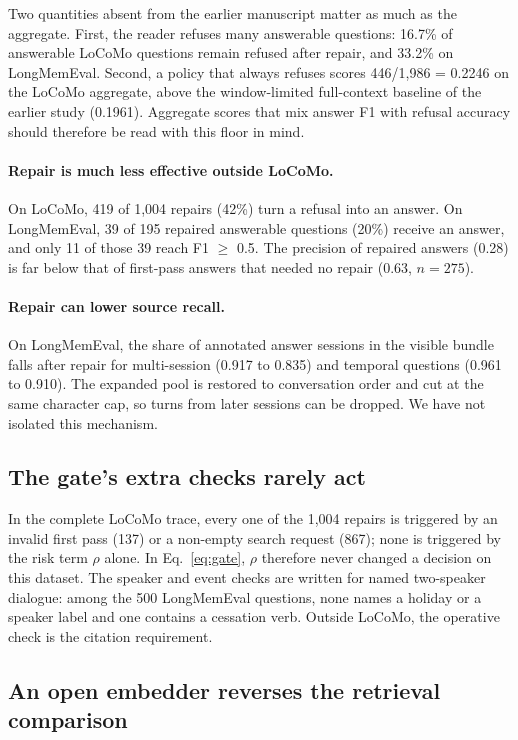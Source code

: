 \documentclass[11pt]{article}
\begin{document}
Two quantities absent from the earlier manuscript matter as much as the
aggregate. First, the reader refuses many answerable questions: 16.7\% of
answerable LoCoMo questions remain refused after repair, and 33.2\% on
LongMemEval. Second, a policy that always refuses scores 446/1,986 = 0.2246 on
the LoCoMo aggregate, above the window-limited full-context baseline of the
earlier study (0.1961). Aggregate scores that mix answer F1 with refusal accuracy
should therefore be read with this floor in mind.

\paragraph{Repair is much less effective outside LoCoMo.}
On LoCoMo, 419 of 1,004 repairs (42\%) turn a refusal into an answer. On
LongMemEval, 39 of 195 repaired answerable questions (20\%) receive an answer,
and only 11 of those 39 reach F1 $\geq$ 0.5. The precision of repaired answers
(0.28) is far below that of first-pass answers that needed no repair (0.63,
$n=275$).

\paragraph{Repair can lower source recall.}
On LongMemEval, the share of annotated answer sessions in the visible bundle
falls after repair for multi-session (0.917 to 0.835) and temporal questions
(0.961 to 0.910). The expanded pool is restored to conversation order and cut
at the same character cap, so turns from later sessions can be dropped. We have
not isolated this mechanism.

\subsection{The gate's extra checks rarely act}
\label{sec:gate}

In the complete LoCoMo trace, every one of the 1,004 repairs is triggered by an
invalid first pass (137) or a non-empty search request (867); none is triggered
by the risk term $\rho$ alone. In Eq.~\eqref{eq:gate}, $\rho$ therefore never
changed a decision on this dataset. The speaker and event checks are written
for named two-speaker dialogue: among the 500 LongMemEval questions, none names
a holiday or a speaker label and one contains a cessation verb. Outside
LoCoMo, the operative check is the citation requirement.

\subsection{An open embedder reverses the retrieval comparison}
\label{sec:retrieval}
\end{document}
